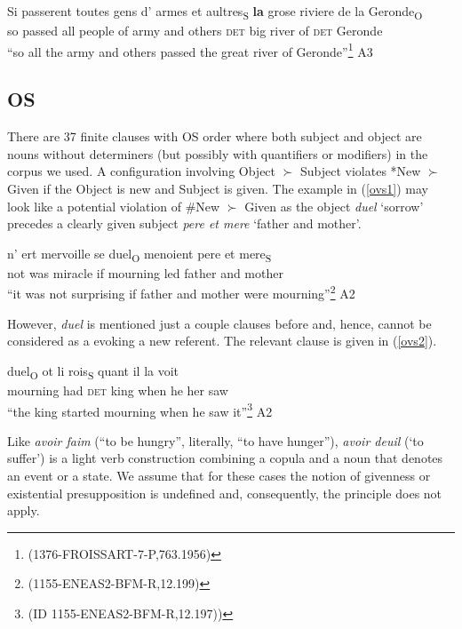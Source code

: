 \documentclass[output=paper,modfonts,nonflat]{langsci/langscibook}
\begin{document}
\ea
\gll Si passerent toutes gens d' armes et aultres\textsubscript{S} {\bfseries la} grose riviere de la Geronde\textsubscript{O}\\
so passed all people of army and others {\scshape det} big river of {\scshape det} Geronde\\ 
\glt ``so all the army and others passed the great river of Geronde''\footnote{{(1376-FROISSART-7-P,763.1956)}}\label{vso2} \hfill A3
\z

\subsection{OS}
 
There are 37 finite clauses with OS order where both subject and object are nouns without determiners (but possibly with quantifiers or modifiers) in the corpus we used. A configuration involving Object $\succ$ Subject violates *New $\succ$ Given if the Object is new and Subject is given. The example in (\ref{ovs1}) may look like a potential violation of \#New $\succ$ Given as the object {\itshape duel} `sorrow' precedes a clearly given subject {\itshape pere et mere} `father and mother'. 

\ea
\gll n' ert mervoille se duel\textsubscript{O} menoient pere et mere\textsubscript{S}\\
not was miracle if mourning led father and mother\\
\glt ``it was not surprising if father and mother were mourning''\footnote{{(1155-ENEAS2-BFM-R,12.199)}}\label{ovs1} \hfill A2
\z

However, {\itshape duel} is mentioned just a couple clauses before and, hence, cannot be considered as a evoking a new referent. The relevant clause is given in (\ref{ovs2}). 

\ea
\gll duel\textsubscript{O} ot li rois\textsubscript{S} quant il la voit\\
mourning had {\scshape det} king when he her saw\\
\glt ``the king started mourning when he saw it''\footnote{{(ID 1155-ENEAS2-BFM-R,12.197))}}\label{ovs2} \hfill A2
\z

Like {\itshape avoir faim} (``to be hungry'', literally, ``to have hunger''), {\itshape avoir deuil} (`to suffer') is a light verb construction combining a copula and a noun that denotes an event or a state. We assume that for these cases the notion of givenness or existential presupposition is undefined and, consequently, the principle does not apply.
\end{document}
